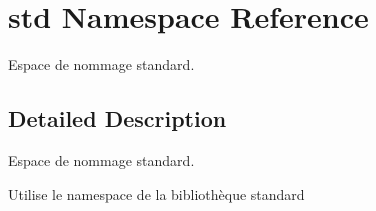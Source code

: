 \hypertarget{namespacestd}{}\section{std Namespace Reference}
\label{namespacestd}


Espace de nommage standard.  




\subsection{Detailed Description}
Espace de nommage standard. 

Utilise le namespace de la bibliothèque standard 